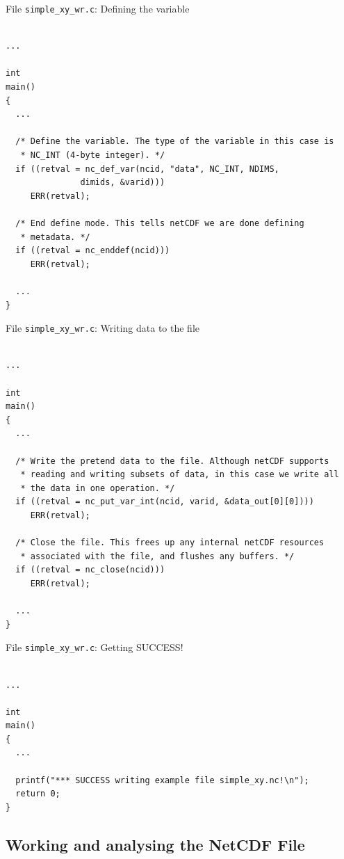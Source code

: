 \documentclass[compress,11pt,xcolor=svgnames,aspectratio=169]{beamer}
\begin{document}
\begin{frame}[fragile]{File \texttt{simple\_xy\_wr.c}: Defining the variable}

\tiny{

\begin{verbatim}

...

int
main()
{
  ...

  /* Define the variable. The type of the variable in this case is
   * NC_INT (4-byte integer). */
  if ((retval = nc_def_var(ncid, "data", NC_INT, NDIMS,
               dimids, &varid)))
     ERR(retval);

  /* End define mode. This tells netCDF we are done defining
   * metadata. */
  if ((retval = nc_enddef(ncid)))
     ERR(retval);

  ...
}

\end{verbatim}

}

\end{frame}

\begin{frame}[fragile]{File \texttt{simple\_xy\_wr.c}: Writing data to the file}

\tiny{

\begin{verbatim}

...

int
main()
{
  ...

  /* Write the pretend data to the file. Although netCDF supports
   * reading and writing subsets of data, in this case we write all
   * the data in one operation. */
  if ((retval = nc_put_var_int(ncid, varid, &data_out[0][0])))
     ERR(retval);

  /* Close the file. This frees up any internal netCDF resources
   * associated with the file, and flushes any buffers. */
  if ((retval = nc_close(ncid)))
     ERR(retval);

  ...
}

\end{verbatim}

}

\end{frame}

\begin{frame}[fragile]{File \texttt{simple\_xy\_wr.c}: Getting SUCCESS!}

\tiny{

\begin{verbatim}

...

int
main()
{
  ...

  printf("*** SUCCESS writing example file simple_xy.nc!\n");
  return 0;
}

\end{verbatim}

}

\subsection{Working and analysing the NetCDF File}

\end{frame}
\end{document}
